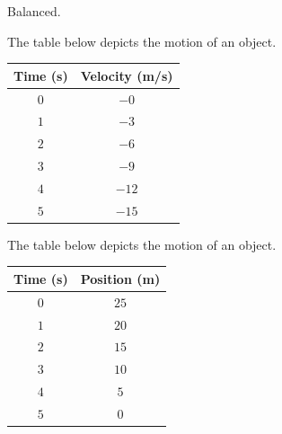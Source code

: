 \documentclass[answers]{exam}
\begin{document}
\begin{questions}
\begin{parts}
\begin{solution}
    Balanced.
\end{solution}
\end{parts}

\question
The table below depicts the motion of an object.

\begin{center}
    \begin{tabular}{|c|c|}
        \hline
        \textbf{Time} (s) & \textbf{Velocity} (m/s) \\ \hline
        $0$ & $-0$ \\ \hline 
        $1$ & $-3$ \\ \hline
        $2$ & $-6$ \\ \hline
        $3$ & $-9$ \\ \hline
        $4$ & $-12$ \\ \hline
        $5$ & $-15$ \\ \hline
    \end{tabular}
\end{center}


\question
The table below depicts the motion of an object.

\begin{center}
    \begin{tabular}{|c|c|}
        \hline
        \textbf{Time} (s) & \textbf{Position} (m) \\ \hline
        $0$ & $25$ \\ \hline 
        $1$ & $20$ \\ \hline
        $2$ & $15$ \\ \hline
        $3$ & $10$ \\ \hline
        $4$ & $5$ \\ \hline
        $5$ & $0$ \\ \hline
    \end{tabular}
\end{center}


\end{questions}
\end{document}
